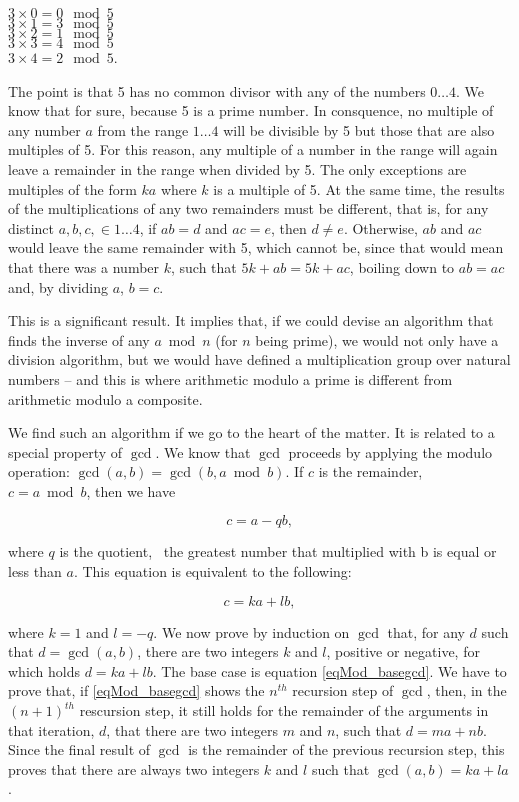 \documentclass{scrreprt}
\begin{document}
$3 \times 0 = 0 \mod 5$\\
$3 \times 1 = 3 \mod 5$\\
$3 \times 2 = 1 \mod 5$\\
$3 \times 3 = 4 \mod 5$\\
$3 \times 4 = 2 \mod 5$.

The point is that 5 has no common divisor
with any of the numbers $0\dots 4$.
We know that for sure,
because 5 is a prime number.
In consquence, no multiple of any number $a$ 
from the range $1\dots 4$ will be divisible by 5
but those that are also multiples of 5.
For this reason, any multiple of a number in the range
will again leave a remainder in the range when divided by 5.
The only exceptions are multiples of the form $ka$
where $k$ is a multiple of 5.
At the same time, the results of the multiplications
of any two remainders must be different,
that is, for any distinct $a,b,c, \in 1\dots 4$,
if $ab = d$ and $ac = e$, then $d \neq e$.
Otherwise, $ab$ and $ac$ would leave the same remainder
with 5, which cannot be, since that would mean that
there was a number $k$, such that $5k + ab = 5k + ac$,
boiling down to $ab = ac$ and, by dividing $a$, $b = c$.

This is a significant result.
It implies that, if we could devise an algorithm
that finds the inverse of any $a \bmod n$
(for $n$ being prime), we would not only have 
a division algorithm, but we would have defined
a multiplication group over natural numbers --
and this is where arithmetic modulo a prime
is different from arithmetic modulo a composite.

We find such an algorithm if we go to the 
heart of the matter.
It is related to a special property of $\gcd$.
We know that $\gcd$ proceeds by applying the modulo operation:
$\gcd(a,b) = \gcd(b, a \bmod b)$.
If $c$ is the remainder, \ie\
$c = a \bmod b$, then we have

\begin{equation}\label{eqMod_rem}
c = a - qb,
\end{equation}

where $q$ is the quotient, \ie\ the greatest number
that multiplied with b is equal or less than $a$.
This equation is equivalent to the following:

\begin{equation}\label{eqMod_basegcd}
c = ka + lb,
\end{equation}

where $k = 1$ and $l = -q$.
We now prove by induction on $\gcd$ that, for any $d$ such that
$d = \gcd(a,b)$, there are two integers $k$ and $l$,
positive or negative, for which holds $d = ka + lb$.
The base case is equation \ref{eqMod_basegcd}.
We have to prove that, if \ref{eqMod_basegcd}
shows the $n^{th}$ recursion step of $\gcd$, 
then, in the $(n+1)^{th}$ rescursion step,
it still holds for the remainder of the arguments
in that iteration, $d$, that there are two integers
$m$ and $n$, such that $d = ma + nb$.
Since the final result of $\gcd$ is the remainder 
of the previous recursion step,
this proves that there are always two integers $k$ and $l$
such that $\gcd(a,b) = ka + la$.
\end{document}
